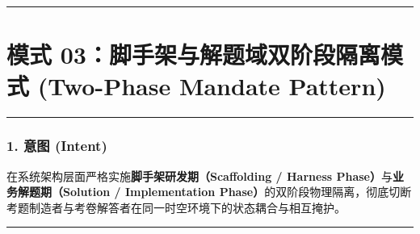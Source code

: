 \begin{Shaded}
\begin{Highlighting}[]
    \NormalTok{ (}
      \NormalTok{ \{}
\OperatorTok{:} \OperatorTok{,}
\OperatorTok{:} \OperatorTok{,}
\OperatorTok{:}\NormalTok{ [}\NormalTok{]}\OperatorTok{,}
\OperatorTok{:} 
\NormalTok{      \}}\OperatorTok{;}
\NormalTok{    \}}

     \OperatorTok{,}\OperatorTok{;}
\NormalTok{  \}}
\NormalTok{\}}
\end{Highlighting}
\end{Shaded}

\begin{center}\rule{0.5\linewidth}{0.5pt}\end{center}

\section{模式 03：脚手架与解题域双阶段隔离模式 (Two-Phase Mandate
Pattern)}\label{ux6a21ux5f0f-03ux811aux624bux67b6ux4e0eux89e3ux9898ux57dfux53ccux9636ux6bb5ux9694ux79bbux6a21ux5f0f-two-phase-mandate-pattern}

\begin{center}\rule{0.5\linewidth}{0.5pt}\end{center}

\subsubsection{1. 意图 (Intent)}\label{ux610fux56fe-intent-2}

在系统架构层面严格实施\textbf{脚手架研发期（Scaffolding / Harness
Phase）}与\textbf{业务解题期（Solution / Implementation
Phase）}的双阶段物理隔离，彻底切断考题制造者与考卷解答者在同一时空环境下的状态耦合与相互掩护。

\begin{center}\rule{0.5\linewidth}{0.5pt}\end{center}

